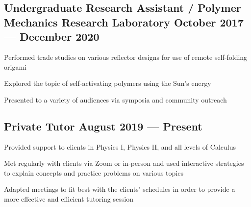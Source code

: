 \documentclass[letter,10pt]{article}
\begin{document}
\subsection{{Undergraduate Research Assistant / Polymer Mechanics Research Laboratory \hfill October 2017 --- December 2020}}
\begin{zitemize}
    \item Performed trade studies on various reflector designs for use of remote self-folding origami
    \item Explored the topic of self-activating polymers using the Sun's energy
    \item Presented to a variety of audiences via symposia and community outreach
\end{zitemize}

\subsection{{Private Tutor \hfill August 2019 --- Present}}
\begin{zitemize}
    \item Provided support to clients in Physics I, Physics II, and all levels of Calculus
    \item Met regularly with clients via Zoom or in-person and used interactive strategies to explain concepts and practice problems on various topics
    \item Adapted meetings to fit best with the clients' schedules in order to provide a more effective and efficient tutoring session
\end{zitemize}
\end{document}
